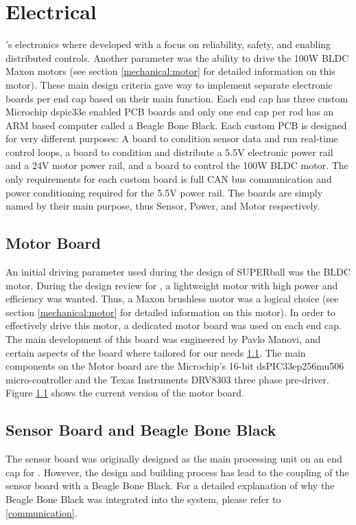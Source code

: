 \section{Electrical}
\SB{}'s electronics where developed with a focus on reliability, safety, and enabling distributed controls.
Another parameter was the ability to drive the 100W BLDC Maxon motors (see section \ref{mechanical:motor} for detailed information on this motor).
These main design criteria gave way to implement separate electronic boards per end cap based on their main function.
Each end cap has three custom Microchip dspic33e enabled PCB boards and only one end cap per rod has an ARM based computer called a Beagle Bone Black.
Each custom PCB is designed for very different purposes: A board to condition sensor data and run real-time control loops, a board to condition and distribute a 5.5V electronic power rail and a 24V motor power rail, and a board to control the 100W BLDC motor. 
The only requirements for each custom board is full CAN bus communication and power conditioning required for the 5.5V power rail.
The boards are simply named by their main purpose, thus Sensor, Power, and Motor respectively.

\subsection{Motor Board}
An initial driving parameter used during the design of SUPERball was the BLDC motor. 
During the design review for \SB{}, a lightweight motor with high power and efficiency was wanted.
Thus, a Maxon brushless motor was a logical choice (see section \ref{mechanical:motor} for detailed information on this motor).
In order to effectively drive this motor, a dedicated motor board was used on each end cap.
The main development of this board was engineered by Pavlo Manovi, and certain aspects of the board where tailored for our needs \ref{}.
The main components on the Motor board are the Microchip's 16-bit dsPIC33ep256mu506 micro-controller and the Texas Instruments DRV8303 three phase pre-driver.
Figure \ref{} shows the current version of the motor board.

\subsection{Sensor Board and Beagle Bone Black}
\label{sensor_bbb}
The sensor board was originally designed as the main processing unit on an end cap for \SB{}. 
However, the design and building process has lead to the coupling of the sensor board with a Beagle Bone Black.
For a detailed explanation of why the Beagle Bone Black was integrated into the system, please refer to \ref{communication}.

